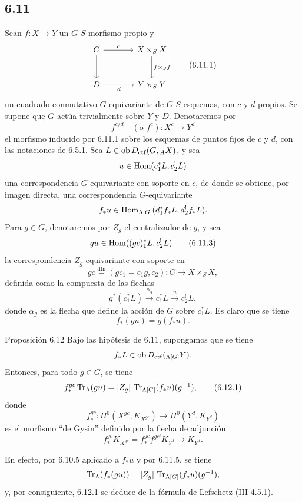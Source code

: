 \subsection*{6.11}
Sean $f:X\to Y$ un $G$-$S$-morfismo propio y
\begin{equation}
\begin{tikzcd}[column sep=large,row sep=large]
C \arrow[r,"c"] \arrow[d] & X\times_SX \arrow[d,"f\times_Sf"]\\
D \arrow[r,"d"'] & Y\times_SY
\end{tikzcd}
\tag{6.11.1}
\end{equation}
un cuadrado conmutativo $G$-equivariante de $G$-$S$-esquemas, con $c$ y $d$ propios. Se supone que $G$ actúa trivialmente sobre $Y$ y $D$. Denotaremos por
\begin{equation}
f^{c/d}\quad(\text{o } f^c):X^c\longrightarrow Y^d
\tag{6.11.2}
\end{equation}
el morfismo inducido por 6.11.1 sobre los esquemas de puntos fijos de $c$ y $d$, con las notaciones de 6.5.1. Sea $L\in\operatorname{ob} D_{\mathrm{ctf}}(G,{}_AX)$, y sea
\[
u\in\operatorname{Hom}(c_1^*L,c_2^!L)
\]
una correspondencia $G$-equivariante con soporte en $c$, de donde se obtiene, por imagen directa, una correspondencia $G$-equivariante
\[
f_*u\in\operatorname{Hom}_{\Lambda[G]}(d_1^*f_*L,d_2^!f_*L).
\]
Para $g\in G$, denotaremos por $Z_g$ el centralizador de $g$, y sea
\begin{equation}
gu\in\operatorname{Hom}((gc)_1^*L,c_2^!L)
\tag{6.11.3}
\end{equation}
la correspondencia $Z_g$-equivariante con soporte en
\begin{equation}
gc\stackrel{\mathrm{dfn}}{=}(gc_1=c_1g,c_2):C\to X\times_SX,
\tag{6.11.4}
\end{equation}
definida como la compuesta de las flechas
\[
g^*(c_1^*L)\xrightarrow{\alpha_g}c_1^*L\xrightarrow{u}c_2^!L,
\]
donde $\alpha_g$ es la flecha que define la acción de $G$ sobre $c_1^*L$. Es claro que se tiene
\begin{equation}
f_*(gu)=g(f_*u).
\tag{6.11.5}
\end{equation}

\begin{statement}{Proposición 6.12}
Bajo las hipótesis de 6.11, supongamos que se tiene
\[
f_*L\in\operatorname{ob} D_{\mathrm{ctf}}({}_{\Lambda[G]}Y).
\]
Entonces, para todo $g\in G$, se tiene
\begin{equation}
f_*^{gc}\operatorname{Tr}_{\Lambda}(gu)
=
|Z_g|\,\operatorname{Tr}_{\Lambda[G]}(f_*u)(g^{-1}),
\tag{6.12.1}
\end{equation}
donde
\[
f_*^{gc}:H^0(X^{gc},K_{X^{gc}})\longrightarrow H^0(Y^d,K_{Y^d})
\]
es el morfismo ``de Gysin'' definido por la flecha de adjunción
\[
f_*^{gc}K_{X^{gc}}=f_*^{gc}f^{gc!}K_{Y^d}\longrightarrow K_{Y^d}.
\]
\end{statement}

En efecto, por 6.10.5 aplicado a $f_*u$ y por 6.11.5, se tiene
\[
\operatorname{Tr}_{\Lambda}(f_*(gu))=|Z_g|\,\operatorname{Tr}_{\Lambda[G]}(f_*u)(g^{-1}),
\]
y, por consiguiente, 6.12.1 se deduce de la fórmula de Lefschetz (III 4.5.1).
